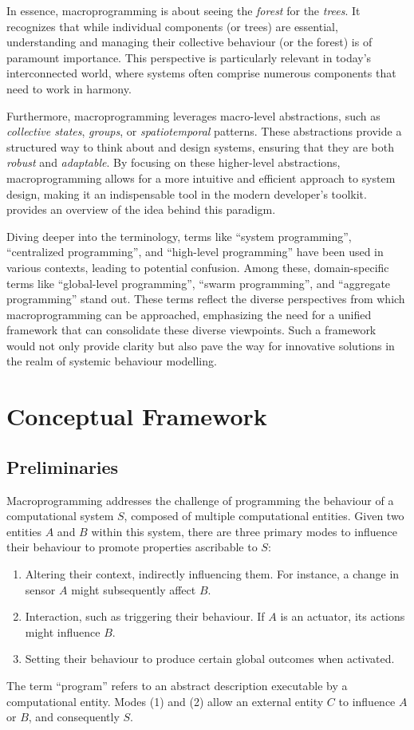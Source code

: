 In essence, macroprogramming is about seeing the \emph{forest} for the \emph{trees}. 
 It recognizes that while individual components (or trees) are essential,
 understanding and managing their collective behaviour (or the forest) is of paramount importance. 
This perspective is particularly relevant in today's interconnected world, 
 where systems often comprise numerous components that need to work in harmony.

Furthermore, macroprogramming leverages macro-level abstractions, 
 such as \emph{collective states}, \emph{groups}, or \emph{spatiotemporal} patterns. 
 These abstractions provide a structured way to think about and design systems, ensuring that they are both \emph{robust} and \emph{adaptable}. 
By focusing on these higher-level abstractions, 
 macroprogramming allows for a more intuitive and efficient approach to system design, 
 making it an indispensable tool in the modern developer's toolkit.
 provides an overview of the idea behind this paradigm.

Diving deeper into the terminology, 
 terms like ``system programming'', ``centralized programming'', and ``high-level programming'' 
 have been used in various contexts, leading to potential confusion. 
% 
Among these, domain-specific terms like ``global-level programming'', ``swarm programming'', and 
 ``aggregate programming'' stand out. 
%
These terms reflect the diverse perspectives from which macroprogramming can be approached, 
 emphasizing the need for a unified framework that can consolidate these diverse viewpoints. 
%
Such a framework would not only provide clarity but also pave the way for innovative solutions in the realm of systemic behaviour modelling.

\section{Conceptual Framework}

\subsection{Preliminaries}
Macroprogramming addresses the challenge of programming the behaviour of a computational system \( S \), composed of multiple computational entities. 
 Given two entities \( A \) and \( B \) within this system, 
 there are three primary modes to influence their behaviour to promote properties ascribable to \( S \):
\begin{enumerate}
    \item Altering their context, 
    indirectly influencing them. 
    For instance, a change in sensor \( A \) might subsequently affect \( B \).
    \item Interaction, such as triggering their behaviour. 
    If \( A \) is an actuator, its actions might influence \( B \).
    \item Setting their behaviour to produce certain global outcomes when activated.
\end{enumerate}
The term ``program'' refers to an abstract description executable by a computational entity. 
 Modes (1) and (2) allow an external entity \( C \) to influence \( A \) or \( B \), and consequently \( S \).

